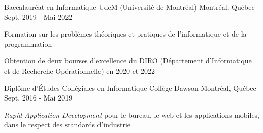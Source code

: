 

\begin{cventries}

  \cventry
    {Baccalauréat en Informatique} %
    {UdeM (Université de Montréal)} %
    {Montréal, Québec} %
    {Sept. 2019 - Mai 2022} %
    {
      \begin{cvitems} %
        \item {Formation sur les problèmes théoriques et pratiques de l'informatique et de la programmation}
        \item {Obtention de deux bourses d'excellence du DIRO (Département d'Informatique et de Recherche Opérationnelle) en 2020 et 2022}
      \end{cvitems}
    }
  \cventry
    {Diplôme d'Études Collégiales en Informatique} %
    {Collège Dawson} %
    {Montréal, Québec} %
    {Sept. 2016 - Mai 2019} %
    {
      \begin{cvitems} %
        \item {\textit{Rapid Application Development} pour le bureau, le web et les applications mobiles, dans le respect des standards d'industrie}
      \end{cvitems}
    }

\end{cventries}

